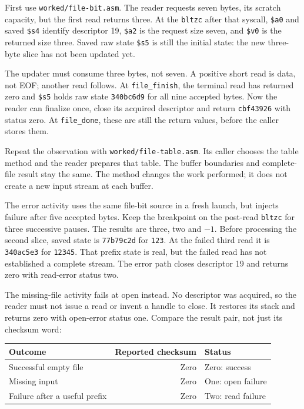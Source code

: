 First use \texttt{worked/\allowbreak file-bit.asm}. The reader requests seven
bytes, its scratch capacity, but the first read returns three. At the
\texttt{bltzc} after that syscall, \texttt{\$a0} and saved \texttt{\$s4} identify
descriptor 19, \texttt{\$a2} is the request size seven, and \texttt{\$v0} is the
returned size three. Saved raw state \texttt{\$s5} is still the initial state:
the new three-byte slice has not been updated yet.

The updater must consume three bytes, not seven. A positive short read is data,
not EOF; another read follows. At \texttt{file\_finish}, the terminal read has
returned zero and \texttt{\$s5} holds raw state \texttt{340bc6d9} for all nine
accepted bytes. Now the reader can finalize once, close its acquired descriptor
and return \texttt{cbf43926} with status zero. At \texttt{file\_done}, these are
still the return values, before the caller stores them.

Repeat the observation with \texttt{worked/\allowbreak file-table.asm}. Its
caller chooses the table method and the reader prepares that table. The buffer
boundaries and complete-file result stay the same. The method changes the work
performed; it does not create a new input stream at each buffer.

The error activity uses the same file-bit source in a fresh launch, but injects
failure after five accepted bytes. Keep the breakpoint on the post-read
\texttt{bltzc} for three successive pauses. The results are three, two and $-1$.
Before processing the second slice, saved state is \texttt{77b79c2d} for
\texttt{123}. At the failed third read it is \texttt{340ac5e3} for
\texttt{12345}. That prefix state is real, but the failed read has not established
a complete stream. The error path closes descriptor 19 and returns zero with
read-error status two.



The missing-file activity fails at open instead. No descriptor was acquired,
so the reader must not issue a read or invent a handle to close. It restores
its stack and returns zero with open-error status one. Compare the result pair,
not just its checksum word:

\begin{center}
  \begin{tabular}{@{}lrl@{}}
    \toprule
    Outcome                       & Reported checksum & Status            \\
    \midrule
    Successful empty file         & Zero              & Zero: success     \\
    Missing input                 & Zero              & One: open failure \\
    Failure after a useful prefix & Zero              & Two: read failure \\
    \bottomrule
  \end{tabular}
\end{center}

